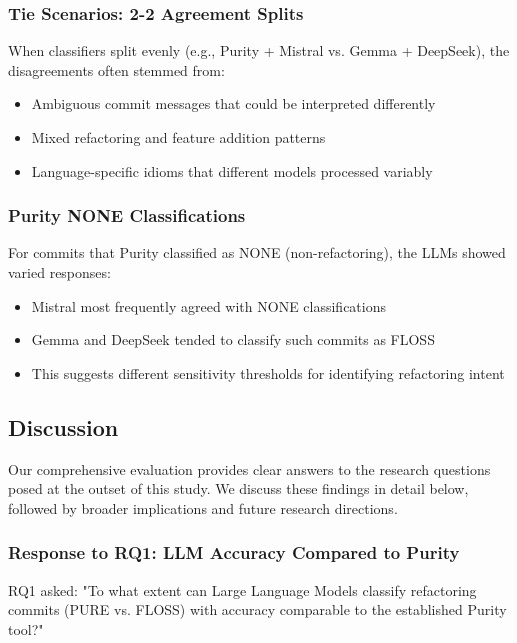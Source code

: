 \subsubsection{Tie Scenarios: 2-2 Agreement Splits}

When classifiers split evenly (e.g., Purity + Mistral vs. Gemma + DeepSeek), the disagreements often stemmed from:
\begin{itemize}
    \item Ambiguous commit messages that could be interpreted differently
    \item Mixed refactoring and feature addition patterns
    \item Language-specific idioms that different models processed variably
\end{itemize}

\subsubsection{Purity NONE Classifications}

For commits that Purity classified as NONE (non-refactoring), the LLMs showed varied responses:
\begin{itemize}
    \item Mistral most frequently agreed with NONE classifications
    \item Gemma and DeepSeek tended to classify such commits as FLOSS
    \item This suggests different sensitivity thresholds for identifying refactoring intent
\end{itemize}

\subsection{Discussion}

Our comprehensive evaluation provides clear answers to the research questions posed at the outset of this study. We discuss these findings in detail below, followed by broader implications and future research directions.

\subsubsection{Response to RQ1: LLM Accuracy Compared to Purity}

RQ1 asked: "To what extent can Large Language Models classify refactoring commits (PURE vs. FLOSS) with accuracy comparable to the established Purity tool?"

